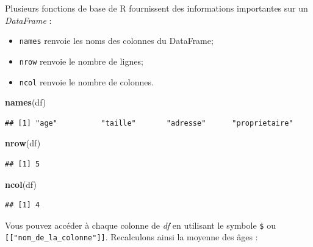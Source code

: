 \documentclass[
  11pt,
  french,
]{book}
\makeatletter
\newenvironment{Shaded}{\begin{snugshade}}{\end{snugshade}}
\newcommand{\KeywordTok}[1]{\textcolor[rgb]{0.13,0.29,0.53}{\textbf{#1}}}
\newcommand{\NormalTok}[1]{#1}
\newcommand{\OperatorTok}[1]{\textcolor[rgb]{0.81,0.36,0.00}{\textbf{#1}}}
\providecommand{\tightlist}{%
  \setlength{\itemsep}{0pt}\setlength{\parskip}{0pt}}
\newenvironment{kframe}{%
\medskip{}
\setlength{\fboxsep}{.8em}
 \def\at@end@of@kframe{}%
 \ifinner\ifhmode%
  \def\at@end@of@kframe{\end{minipage}}%
  \begin{minipage}{\columnwidth}%
 \fi\fi%
 \def\FrameCommand##1{\hskip\@totalleftmargin \hskip-\fboxsep
 \colorbox{shadecolor}{##1}\hskip-\fboxsep
     \hskip-\linewidth \hskip-\@totalleftmargin \hskip\columnwidth}%
 \MakeFramed {\advance\hsize-\width
   \@totalleftmargin\z@ \linewidth\hsize
   \@setminipage}}%
 {\par\unskip\endMakeFramed%
 \at@end@of@kframe}
\renewenvironment{Shaded}{\begin{kframe}}{\end{kframe}}
\makeatother
\begin{document}
Plusieurs fonctions de base de R fournissent des informations importantes sur un \emph{DataFrame} :

\begin{itemize}
\tightlist
\item
  \texttt{names} renvoie les noms des colonnes du DataFrame;
\item
  \texttt{nrow} renvoie le nombre de lignes;
\item
  \texttt{ncol} renvoie le nombre de colonnes.
\end{itemize}

\begin{Shaded}
\begin{Highlighting}[]
\KeywordTok{names}\NormalTok{(df)}
\end{Highlighting}
\end{Shaded}

\begin{verbatim}
## [1] "age"          "taille"       "adresse"      "proprietaire"
\end{verbatim}

\begin{Shaded}
\begin{Highlighting}[]
\KeywordTok{nrow}\NormalTok{(df)}
\end{Highlighting}
\end{Shaded}

\begin{verbatim}
## [1] 5
\end{verbatim}

\begin{Shaded}
\begin{Highlighting}[]
\KeywordTok{ncol}\NormalTok{(df)}
\end{Highlighting}
\end{Shaded}

\begin{verbatim}
## [1] 4
\end{verbatim}

Vous pouvez accéder à chaque colonne de \emph{df} en utilisant le symbole \texttt{\$} ou \texttt{{[}{[}"nom\_de\_la\_colonne"{]}{]}}. Recalculons ainsi la moyenne des âges :

\begin{Shaded}
\end{Shaded}
\end{document}
